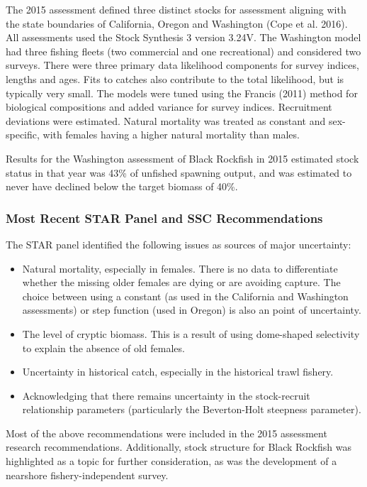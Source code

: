 \documentclass[11pt,
  english,
  letterpaper,
]{article}
\providecommand{\tightlist}{%
  \setlength{\itemsep}{0pt}\setlength{\parskip}{0pt}}
\providecommand{\tightlist}{%
  \setlength{\itemsep}{0pt}\setlength{\parskip}{0pt}}
\begin{document}
The 2015 assessment defined three distinct stocks for assessment aligning with the state boundaries of California, Oregon and Washington (Cope et al. 2016). All assessments used the Stock Synthesis 3 version 3.24V. The Washington model had three fishing fleets (two commercial and one recreational) and considered two surveys. There were three primary data likelihood components for survey indices, lengths and ages. Fits to catches also contribute to the total likelihood, but is typically very small. The models were tuned using the Francis (2011) method for biological compositions and added variance for survey indices. Recruitment deviations were estimated. Natural mortality was treated as constant and sex-specific, with females having a higher natural mortality than males.

Results for the Washington assessment of Black Rockfish in 2015 estimated stock status in that year was 43\% of unfished spawning output, and was estimated to never have declined below the target biomass of 40\%.

\hypertarget{most-recent-star-panel-and-ssc-recommendations}{%
\subsubsection{Most Recent STAR Panel and SSC Recommendations}\label{most-recent-star-panel-and-ssc-recommendations}}

The STAR panel identified the following issues as sources of major uncertainty:

\begin{itemize}
\tightlist
\item
  Natural mortality, especially in females. There is no data to differentiate whether the missing older females are dying or are avoiding capture. The choice between using a constant (as used in the California and Washington assessments) or step function (used in Oregon) is also an point of uncertainty.
\item
  The level of cryptic biomass. This is a result of using dome-shaped selectivity to explain the absence of old females.
\item
  Uncertainty in historical catch, especially in the historical trawl fishery.
\item
  Acknowledging that there remains uncertainty in the stock-recruit relationship parameters (particularly the Beverton-Holt steepness parameter).
\end{itemize}

Most of the above recommendations were included in the 2015 assessment research recommendations. Additionally, stock structure for Black Rockfish was highlighted as a topic for further consideration, as was the development of a nearshore fishery-independent survey.
\end{document}
